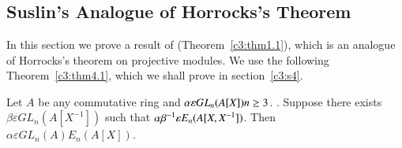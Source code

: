 \chapter{}\label{chap3}

\section{Suslin's Analogue of Horrocks's Theorem}\label{c3:s1}

In this section we prove a result of \citeauthor{Suslina} (Theorem~\ref{c3:thm1.1}),
which is an analogue of Horrocks's theorem on projective modules. We
use the following Theorem~\ref{c3:thm4.1}, which we shall prove in section~\ref{c3:s4}.


\begin{thm}\label{c3:thm1.1}
Let $A$ be any commutative ring and $\alpha \varepsilon\\ GL_n(A[X])
n\geq 3$. . Suppose there exists $\beta \varepsilon GL_n(A[X^{-1}])$
such that $\alpha\beta^{-1}\varepsilon E_n\\(A[X,X^{-1}])$. Then $\alpha
\varepsilon GL_n(A)E_n(A[X])$. 
\end{thm}

